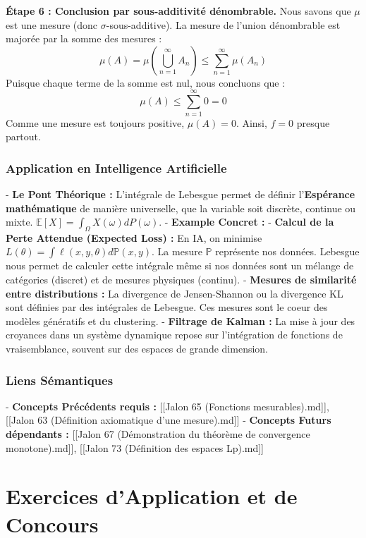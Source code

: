\documentclass[11pt,a4paper]{article}
\begin{document}
\textbf{Étape 6 : Conclusion par sous-additivit\'e d\'enombrable.}
Nous savons que $\mu$ est une mesure (donc $\sigma$-sous-additive). La mesure de l'union d\'enombrable est major\'ee par la somme des mesures :
$$\mu(A) = \mu\left( \bigcup_{n=1}^\infty A_n \right) \le \sum_{n=1}^\infty \mu(A_n)$$
Puisque chaque terme de la somme est nul, nous concluons que :
$$\mu(A) \le \sum_{n=1}^\infty 0 = 0$$
Comme une mesure est toujours positive, $\mu(A) = 0$. Ainsi, $f = 0$ presque partout.

\section{Application en Intelligence Artificielle}

- \textbf{Le Pont Th\'eorique :} L'int\'egrale de Lebesgue permet de d\'efinir l'\textbf{Esp\'erance math\'ematique} de mani\`ere universelle, que la variable soit discr\`ete, continue ou mixte. $\mathbb{E}[X] = \int_\Omega X(\omega) dP(\omega)$.
- \textbf{Example Concret :}
    - \textbf{Calcul de la Perte Attendue (Expected Loss) :} En IA, on minimise $L(\theta) = \int \ell(x, y, \theta) d\mathbb{P}(x, y)$. La mesure $\mathbb{P}$ repr\'esente nos donn\'ees. Lebesgue nous permet de calculer cette int\'egrale m\^eme si nos donn\'ees sont un m\'elange de cat\'egories (discret) et de mesures physiques (continu).
    - \textbf{Mesures de similarit\'e entre distributions :} La divergence de Jensen-Shannon ou la divergence KL sont d\'efinies par des int\'egrales de Lebesgue. Ces mesures sont le coeur des mod\`eles g\'en\'eratifs et du clustering.
    - \textbf{Filtrage de Kalman :} La mise \`a jour des croyances dans un syst\`eme dynamique repose sur l'int\'egration de fonctions de vraisemblance, souvent sur des espaces de grande dimension.

\section{Liens S\'emantiques}

- \textbf{Concepts Pr\'ec\'edents requis :} [[Jalon 65 (Fonctions mesurables).md]], [[Jalon 63 (D\'efinition axiomatique d'une mesure).md]]
- \textbf{Concepts Futurs d\'ependants :} [[Jalon 67 (D\'emonstration du th\'eor\`eme de convergence monotone).md]], [[Jalon 73 (D\'efinition des espaces Lp).md]]


\newpage
\part{Exercices d'Application et de Concours}
\end{document}
